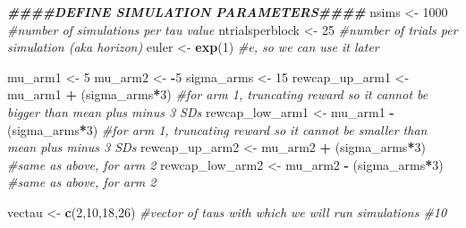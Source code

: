 \documentclass[
]{article}
\newenvironment{Shaded}{\begin{snugshade}}{\end{snugshade}}
\newcommand{\CommentTok}[1]{\textcolor[rgb]{0.56,0.35,0.01}{\textit{#1}}}
\newcommand{\DecValTok}[1]{\textcolor[rgb]{0.00,0.00,0.81}{#1}}
\newcommand{\DocumentationTok}[1]{\textcolor[rgb]{0.56,0.35,0.01}{\textbf{\textit{#1}}}}
\newcommand{\FunctionTok}[1]{\textcolor[rgb]{0.13,0.29,0.53}{\textbf{#1}}}
\newcommand{\NormalTok}[1]{#1}
\newcommand{\OtherTok}[1]{\textcolor[rgb]{0.56,0.35,0.01}{#1}}
\newcommand{\SpecialCharTok}[1]{\textcolor[rgb]{0.81,0.36,0.00}{\textbf{#1}}}
\begin{document}
\begin{Shaded}
\begin{Highlighting}[]
\DocumentationTok{\#\#\#\#DEFINE SIMULATION PARAMETERS\#\#\#\#}
\NormalTok{nsims }\OtherTok{\textless{}{-}} \DecValTok{1000} \CommentTok{\#number of simulations per tau value}
\NormalTok{ntrialsperblock }\OtherTok{\textless{}{-}} \DecValTok{25} \CommentTok{\#number of trials per simulation (aka horizon)}
\NormalTok{euler }\OtherTok{\textless{}{-}} \FunctionTok{exp}\NormalTok{(}\DecValTok{1}\NormalTok{) }\CommentTok{\#e, so we can use it later}

\NormalTok{mu\_arm1 }\OtherTok{\textless{}{-}} \DecValTok{5}
\NormalTok{mu\_arm2 }\OtherTok{\textless{}{-}} \SpecialCharTok{{-}}\DecValTok{5}
\NormalTok{sigma\_arms }\OtherTok{\textless{}{-}} \DecValTok{15}
\NormalTok{rewcap\_up\_arm1 }\OtherTok{\textless{}{-}}\NormalTok{ mu\_arm1 }\SpecialCharTok{+}\NormalTok{ (sigma\_arms}\SpecialCharTok{*}\DecValTok{3}\NormalTok{) }\CommentTok{\#for arm 1, truncating reward so it cannot be bigger than mean plus minus 3 SDs}
\NormalTok{rewcap\_low\_arm1 }\OtherTok{\textless{}{-}}\NormalTok{ mu\_arm1 }\SpecialCharTok{{-}}\NormalTok{ (sigma\_arms}\SpecialCharTok{*}\DecValTok{3}\NormalTok{) }\CommentTok{\#for arm 1, truncating reward so it cannot be smaller than mean plus minus 3 SDs}
\NormalTok{rewcap\_up\_arm2 }\OtherTok{\textless{}{-}}\NormalTok{ mu\_arm2 }\SpecialCharTok{+}\NormalTok{ (sigma\_arms}\SpecialCharTok{*}\DecValTok{3}\NormalTok{) }\CommentTok{\#same as above, for arm 2}
\NormalTok{rewcap\_low\_arm2 }\OtherTok{\textless{}{-}}\NormalTok{ mu\_arm2 }\SpecialCharTok{{-}}\NormalTok{ (sigma\_arms}\SpecialCharTok{*}\DecValTok{3}\NormalTok{) }\CommentTok{\#same as above, for arm 2}

\NormalTok{vectau }\OtherTok{\textless{}{-}} \FunctionTok{c}\NormalTok{(}\DecValTok{2}\NormalTok{,}\DecValTok{10}\NormalTok{,}\DecValTok{18}\NormalTok{,}\DecValTok{26}\NormalTok{) }\CommentTok{\#vector of taus with which we will run simulations \#10}
\end{Highlighting}
\end{Shaded}
\end{document}
